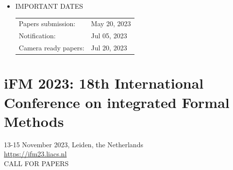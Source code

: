 \documentclass[prodmode,acmtecs]{acmsmall} %
\begin{document}
\begin{itemize}
\item  IMPORTANT DATES 
 
\begin{tabulary}{\linewidth}{LL}Papers submission:  & May 20, 2023 \\
Notification:  & Jul 05, 2023 \\
Camera ready papers:  & Jul 20, 2023 \\
\end{tabulary}
 
\end{itemize}\section{iFM 2023: 18th International Conference on integrated Formal Methods}\label{iFM2023}   13-15 November 2023, Leiden, the Netherlands\\ 
   \href{https://ifm23.liacs.nl}{https://ifm23.liacs.nl}\\ 
CALL FOR PAPERS 
\end{document}
